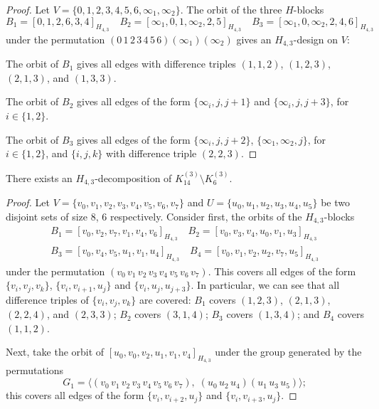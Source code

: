 \begin{subappendices}
\begin{proof}
Let $V = \{0,1,2,3,4,5,6,\infty_1,\infty_2\}$. The orbit of the three $H$-blocks
\[
    B_1 = [0,1,2,6,3,4]_{H_{4,3}} \quad
    B_2 = [\infty_1, 0, 1, \infty_2, 2, 5]_{H_{4,3}} \quad
    B_3 = [\infty_1, 0, \infty_2, 2, 4, 6]_{H_{4,3}}
\]
under the permutation $(0\, 1\, 2\, 3\, 4\, 5\, 6)(\infty_1)(\infty_2)$ gives an $H_{4,3}$-design on $V$:

The orbit of $B_1$ gives all edges with difference triples $(1, 1, 2)$, $(1, 2, 3)$, $(2, 1, 3)$, and $(1, 3, 3)$.

The orbit of $B_2$ gives all edges of the form $\{\infty_i, j, j+1\}$ and $\{\infty_i, j, j+3\}$, for $i \in \{1, 2\}$.

The orbit of $B_3$ gives all edges of the form $\{\infty_i, j, j+2\}$, $\{\infty_1, \infty_2, j\}$, for $i \in \{1, 2\}$, and $\{i, j, k\}$ with difference triple $(2, 2, 3)$.
\end{proof}



\begin{example} \label{eg:H_43-k14-k6}
There exists an $H_{4,3}$-decomposition of $K_{14}^{(3)} \setminus K_{6}^{(3)}$.
\end{example}

\begin{proof}
Let $V = \{v_0, v_1, v_2, v_3, v_4, v_5, v_6, v_7\}$ and $U = \{u_0, u_1, u_2,
u_3, u_4, u_5\}$ be two disjoint sets of size 8, 6 respectively. Consider first, the orbits of the $H_{4,3}$-blocks
\begin{align*}
    B_1 = [v_0, v_2, v_7, v_1, v_4, v_6]_{H_{4,3}} \quad
    B_2 = [v_0, v_3, v_4, u_0, v_1, u_3]_{H_{4,3}} \\
    B_3 = [v_0, v_4, v_5, u_1, v_1, u_4]_{H_{4,3}} \quad
    B_4 = [v_0, v_1, v_2, u_2, v_7, u_5]_{H_{4,3}}
\end{align*}
under the permutation $(v_0 \, v_1 \, v_2 \, v_3 \, v_4 \, v_5 \, v_6 \, v_7)$.
This covers all edges of the form $\{v_i, v_j, v_k\}$, $\{v_i, v_{i+1}, u_j\}$ and $\{v_i, u_j, u_{j+3}\}$.
In particular, we can see that all difference triples of $\{v_i, v_j, v_k\}$ are covered:
$B_1$ covers $(1, 2, 3)$, $(2, 1, 3)$, $(2, 2, 4)$, and $(2, 3, 3)$; $B_2$ covers $(3, 1, 4)$; $B_3$ covers $(1, 3, 4)$; and $B_4$ covers $(1, 1, 2)$.

Next, take the orbit of $[u_0, v_0, v_2, u_1, v_1, v_4]_{H_{4,3}}$ under the group generated by the permutations
\[
    G_1 = \langle (v_0 \, v_1 \, v_2 \, v_3 \, v_4 \, v_5 \, v_6 \, v_7),
    \; (u_0 \, u_2 \, u_4) (u_1 \, u_3 \, u_5) \rangle;
\]
this covers all edges of the form $\{v_i, v_{i+2}, u_j\}$ and $\{v_i, v_{i+3}, u_j\}$.


\end{proof}
\end{subappendices}
